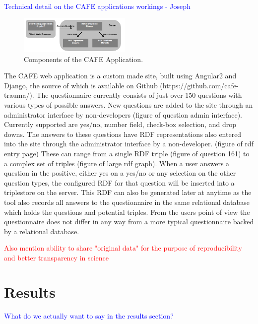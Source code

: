 \documentclass{amia}
\begin{document}
\textcolor{blue}{Technical detail on the CAFE applications workings - Joseph}

\begin{figure}
  \begin{center}
    \includegraphics[width=0.48\textwidth]{pics/cafe_process.png}
  \end{center}
  \caption{Components of the CAFE Application.}
  \label{cafe_process}
\end{figure}

The CAFE web application is a custom made site, built using Angular2 and Django, the source of which is available on Github (https://github.com/cafe-trauma/).
The questionnaire currently consists of just over 150 questions with various types of possible answers.
New questions are added to the site through an administrator interface by non-developers (figure of question admin interface).
Currently supported are yes/no, number field, check-box selection, and drop downs.
The answers to these questions have RDF representations also entered into the site through the administrator interface by a non-developer. (figure of rdf entry page)
These can range from a single RDF triple (figure of question 161) to a complex set of triples (figure of large rdf graph).
When a user answers a question in the positive, either yes on a yes/no or any selection on the other question types, the configured RDF for that question will be inserted into a triplestore on the server.
This RDF can also be generated later at anytime as the tool also records all answers to the questionnaire in the same relational database which holds the questions and potential triples.
From the users point of view the questionnaire does not differ in any way from a more typical questionnaire backed by a relational database.


\textcolor{red}{Also mention ability to share "original data" for the purpose of reproducibility and better transparency in science}

\section*{Results}
\textcolor{blue}{What do we actually want to say in the results section?}
\end{document}
